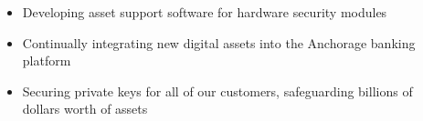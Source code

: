 \begin{itemize}
    \item Developing asset support software for hardware security modules 
    \item Continually integrating new digital assets into the Anchorage banking \\platform
    \item Securing private keys for all of our customers, safeguarding billions of \\dollars worth of assets
\end{itemize}